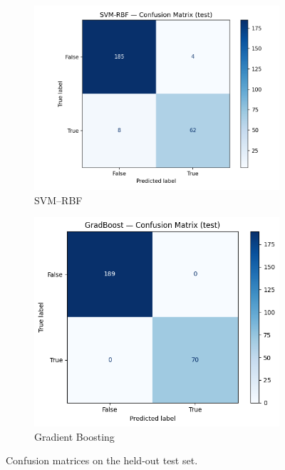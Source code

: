 \documentclass[journal]{IEEEtran}
\begin{document}
\begin{figure}[htbp]
	\centering
	\begin{subfigure}{.48\linewidth}
		\centering
		\includegraphics[width=\linewidth]{assets/cm_svmrbf_test.png}%
		\caption{SVM--RBF}
	\end{subfigure}\hfill
	\begin{subfigure}{.48\linewidth}
		\centering
		\includegraphics[width=\linewidth]{assets/gb_cm.png}%
		\caption{Gradient Boosting}
	\end{subfigure}
	\caption{Confusion matrices on the held-out test set.}
	\label{fig:cm-nonlinear}
\end{figure}
\end{document}
